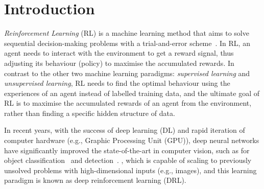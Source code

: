 \chapter{Introduction}





\label{chapter1}
\textit{Reinforcement Learning} (RL) is a machine learning method that aims to solve sequential decision-making problems with a trial-and-error scheme~\cite{sutton2018reinforcement}. In RL, an agent needs to interact with the environment to get a reward signal, thus adjusting its behaviour (policy) to maximise the accumulated rewards. In contrast to the other two machine learning paradigms: \textit{supervised learning} and \textit{unsupervised learning}, RL needs to find the optimal behaviour using the experiences of an agent instead of labelled training data, and the ultimate goal of RL is to maximise the accumulated rewards of an agent from the environment, rather than finding a specific hidden structure of data.

In recent years, with the success of deep learning (DL) and rapid iteration of computer hardware (e.g., Graphic Processing Unit (GPU)), deep neural networks have significantly improved the state-of-the-art in computer vision, such as for object classification~\cite{krizhevsky2012imagenet} and detection~\cite{ren2015faster}. , which is capable of scaling to previously unsolved problems with high-dimensional inputs (e.g., images), and this learning paradigm is known as deep reinforcement learning (DRL). 

